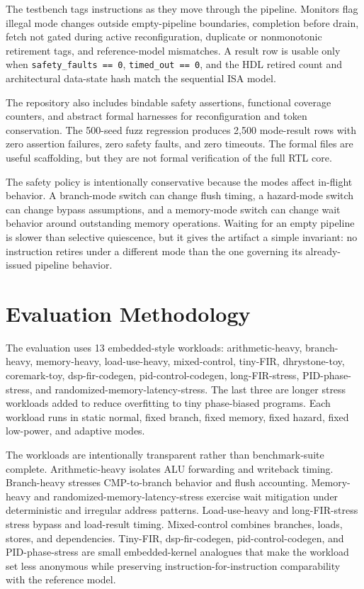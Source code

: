 \documentclass[conference]{IEEEtran}
\begin{document}
The testbench tags instructions as they move through the pipeline. Monitors flag illegal mode changes outside empty-pipeline boundaries, completion before drain, fetch not gated during active reconfiguration, duplicate or nonmonotonic retirement tags, and reference-model mismatches. A result row is usable only when \texttt{safety\_faults == 0}, \texttt{timed\_out == 0}, and the HDL retired count and architectural data-state hash match the sequential ISA model.

The repository also includes bindable safety assertions, functional coverage counters, and abstract formal harnesses for reconfiguration and token conservation. The 500-seed fuzz regression produces 2,500 mode-result rows with zero assertion failures, zero safety faults, and zero timeouts. The formal files are useful scaffolding, but they are not formal verification of the full RTL core.

The safety policy is intentionally conservative because the modes affect in-flight behavior. A branch-mode switch can change flush timing, a hazard-mode switch can change bypass assumptions, and a memory-mode switch can change wait behavior around outstanding memory operations. Waiting for an empty pipeline is slower than selective quiescence, but it gives the artifact a simple invariant: no instruction retires under a different mode than the one governing its already-issued pipeline behavior.

\section{Evaluation Methodology}

The evaluation uses 13 embedded-style workloads: arithmetic-heavy, branch-heavy, memory-heavy, load-use-heavy, mixed-control, tiny-FIR, dhrystone-toy, coremark-toy, dsp-fir-codegen, pid-control-codegen, long-FIR-stress, PID-phase-stress, and randomized-memory-latency-stress. The last three are longer stress workloads added to reduce overfitting to tiny phase-biased programs. Each workload runs in static normal, fixed branch, fixed memory, fixed hazard, fixed low-power, and adaptive modes.

The workloads are intentionally transparent rather than benchmark-suite complete. Arithmetic-heavy isolates ALU forwarding and writeback timing. Branch-heavy stresses CMP-to-branch behavior and flush accounting. Memory-heavy and randomized-memory-latency-stress exercise wait mitigation under deterministic and irregular address patterns. Load-use-heavy and long-FIR-stress stress bypass and load-result timing. Mixed-control combines branches, loads, stores, and dependencies. Tiny-FIR, dsp-fir-codegen, pid-control-codegen, and PID-phase-stress are small embedded-kernel analogues that make the workload set less anonymous while preserving instruction-for-instruction comparability with the reference model.
\end{document}
